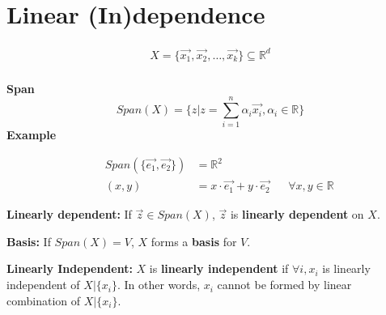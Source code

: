\documentclass[12pt]{article}
\begin{document}
\section{Linear (In)dependence}
\begin{align*}
    X = \{ \vec{x_1}, \vec{x_2}, \dots, \vec{x_k} \} \subseteq \mathbb{R}^d \\
\end{align*}
\begin{tcolorbox}
\textbf{Span}
$$ Span(X) = \Big\{ z | z = \sum_{i=1}^n \alpha_i \vec{x_i}, \alpha_i \in \mathbb{R}\Big\}$$
\textbf{Example}
\begin{center}
\end{center}
\begin{align*}
    && Span(\{\vec{e_1}, \vec{e_2}\}) &= \mathbb{R}^2 && \\
    && (x, y) &= x \cdot \vec{e_1} + y \cdot \vec{e_2} && \forall x, y \in \mathbb{R}
\end{align*}
\end{tcolorbox}
\theoremstyle{definition}
\begin{definition}{\textbf{Linearly dependent: }}
If $\vec{z} \in Span(X)$, $\vec{z}$ is \textbf{linearly dependent} on $X$.
\end{definition}
\theoremstyle{definition}
\begin{definition}{\textbf{Basis: }}
If $Span(X) = V$, $X$ forms a \textbf{basis} for $V$.
\end{definition}
\theoremstyle{definition}
\begin{definition}{\textbf{Linearly Independent: }}
$X$ is \textbf{linearly independent} if $\forall i, x_i$ is linearly independent of $X | \{x_i\}$. In other words, $x_i$ cannot be formed by linear combination of $X | \{x_i\}$.
\end{definition}
\end{document}
